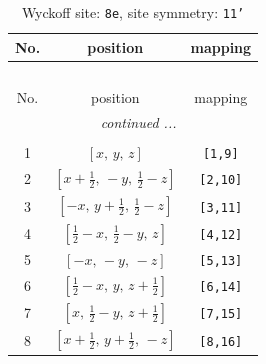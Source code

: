 \documentclass[fleqn,8pt]{jsarticle}
\begin{document}
\renewcommand{\arraystretch}{1.2}
\begin{longtable}{ccc}
\caption{Wyckoff site: {\tt 8e}, site symmetry: {\tt 11'}}
 \\
 \hline \hline
No. & position & mapping \\ \hline \endfirsthead

\multicolumn{2}{l}{\tablename\ \thetable{}} \\
 \hline \hline
No. & position & mapping \\ \hline \endhead

 \hline \hline
\multicolumn{2}{r}{\footnotesize\it continued ...} \\ \endfoot

 \hline \hline
\multicolumn{2}{r}{} \\ \endlastfoot

1 & $\left[ x,\, y,\, z \right]$ & {\tt [1,9]} \\ \hline
2 & $\left[ x + \frac{1}{2},\, - y,\, \frac{1}{2} - z \right]$ & {\tt [2,10]} \\ \hline
3 & $\left[ - x,\, y + \frac{1}{2},\, \frac{1}{2} - z \right]$ & {\tt [3,11]} \\ \hline
4 & $\left[ \frac{1}{2} - x,\, \frac{1}{2} - y,\, z \right]$ & {\tt [4,12]} \\ \hline
5 & $\left[ - x,\, - y,\, - z \right]$ & {\tt [5,13]} \\ \hline
6 & $\left[ \frac{1}{2} - x,\, y,\, z + \frac{1}{2} \right]$ & {\tt [6,14]} \\ \hline
7 & $\left[ x,\, \frac{1}{2} - y,\, z + \frac{1}{2} \right]$ & {\tt [7,15]} \\ \hline
8 & $\left[ x + \frac{1}{2},\, y + \frac{1}{2},\, - z \right]$ & {\tt [8,16]} \\
\end{longtable}
\end{document}

